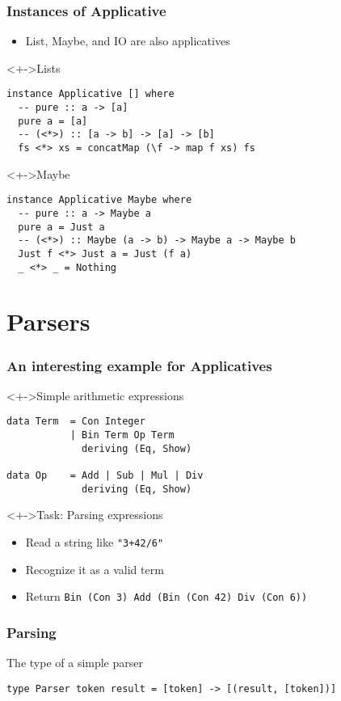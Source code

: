 \documentclass{beamer}
\begin{document}
\begin{frame}[fragile]
  \frametitle{Instances of Applicative}
  \begin{itemize}
  \item<+-> List, Maybe, and IO are also applicatives
  \end{itemize}
  \begin{block}<+->{Lists}
\begin{lstlisting}
instance Applicative [] where
  -- pure :: a -> [a]
  pure a = [a]
  -- (<*>) :: [a -> b] -> [a] -> [b]
  fs <*> xs = concatMap (\f -> map f xs) fs
\end{lstlisting}
  \end{block}
  \begin{block}<+->{Maybe}
\begin{lstlisting}
instance Applicative Maybe where
  -- pure :: a -> Maybe a
  pure a = Just a
  -- (<*>) :: Maybe (a -> b) -> Maybe a -> Maybe b
  Just f <*> Just a = Just (f a)
  _ <*> _ = Nothing
\end{lstlisting}
  \end{block}
\end{frame}

\section{Parsers}
\begin{frame}[fragile]
  \frametitle{An interesting example for Applicatives}
  \begin{block}<+->{Simple arithmetic expressions}
\begin{lstlisting}
data Term  = Con Integer
           | Bin Term Op Term  
             deriving (Eq, Show)
           
data Op    = Add | Sub | Mul | Div
             deriving (Eq, Show)
\end{lstlisting}
\end{block}
\begin{alertblock}<+->{Task: Parsing expressions}
  \begin{itemize}
  \item Read a string like \texttt{"3+42/6"}
  \item Recognize it as a valid term
  \item Return \texttt{Bin (Con 3) Add (Bin (Con 42) Div (Con 6))} 
  \end{itemize}
\end{alertblock}
\end{frame}
\begin{frame}[fragile]
  \frametitle{Parsing}
\begin{block}{The type of a simple parser}
\begin{lstlisting}
type Parser token result = [token] -> [(result, [token])]
\end{lstlisting}  
\end{block}
\end{frame}             
\end{document}
